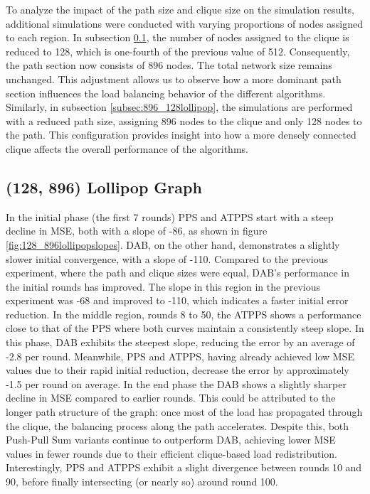 To analyze the impact of the path size and clique size on the simulation results, additional simulations were conducted with varying proportions of nodes assigned to each region. In subsection \ref{subsec:128_896lollipop}, the number of nodes assigned to the clique is reduced to 128, which is one-fourth of the previous value of 512. Consequently, the path section now consists of 896 nodes. The total network size remains unchanged. This adjustment allows us to observe how a more dominant path section influences the load balancing behavior of the different algorithms. Similarly, in subsection \ref{subsec:896_128lollipop}, the simulations are performed with a reduced path size, assigning 896 nodes to the clique and only 128 nodes to the path. This configuration provides insight into how a more densely connected clique affects the overall performance of the algorithms.

\subsection{(128, 896) Lollipop Graph}\label{subsec:128_896lollipop}
In the initial phase (the first 7 rounds) PPS and ATPPS start with a steep decline in MSE, both with a slope of -86, as shown in figure \ref{fig:128_896lollipopslopes}. DAB, on the other hand, demonstrates a slightly slower initial convergence, with a slope of -110. Compared to the previous experiment, where the path and clique sizes were equal, DAB's performance in the initial rounds has improved. The slope in this region in the previous experiment was -68 and improved to -110, which indicates a faster initial error reduction. In the middle region, rounds 8 to 50, the ATPPS shows a performance close to that of the PPS where both curves maintain a consistently steep slope. In this phase, DAB exhibits the steepest slope, reducing the error by an average of -2.8 per round. Meanwhile, PPS and ATPPS, having already achieved low MSE values due to their rapid initial reduction, decrease the error by approximately -1.5 per round on average. In the end phase the DAB shows a slightly sharper decline in MSE compared to earlier rounds. This could be attributed to the longer path structure of the graph: once most of the load has propagated through the clique, the balancing process along the path accelerates. Despite this, both Push-Pull Sum variants continue to outperform DAB, achieving lower MSE values in fewer rounds due to their efficient clique-based load redistribution. Interestingly, PPS and ATPPS exhibit a slight divergence between rounds 10 and 90, before finally intersecting (or nearly so) around round 100.

